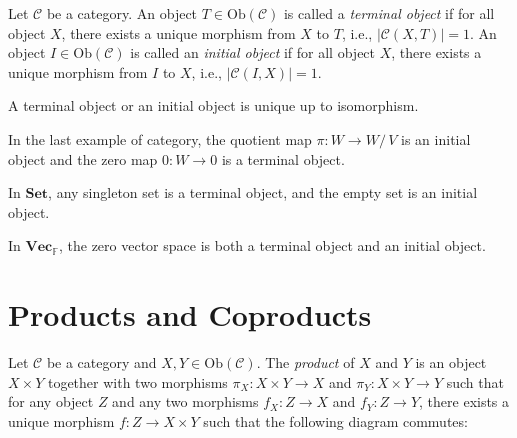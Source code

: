 \documentclass[
	11pt, %
	fleqn, %
	a4paper, %
]{LegrandOrangeBook}
\newcommand{\quotient}[2]{#1 /\, #2} %
\newcommand{\F}{\mathbb{F}} %
\newcommand{\C}{\mathcal{C}} %
\newcommand{\Set}{\textbf{Set}} %
\newcommand{\Vect}{\textbf{Vec}} %
\newcommand{\Ob}[1]{\text{Ob}(#1)} %
\begin{document}
\begin{definition}
    Let $\C$ be a category. An object $T \in \Ob{\C}$ is called a \emph{terminal object} if for all object $X$, there exists a unique morphism from $X$ to $T$, i.e., $|\C(X, T)| = 1$. An object $I \in \Ob{\C}$ is called an \emph{initial object} if for all object $X$, there exists a unique morphism from $I$ to $X$, i.e., $|\C(I, X)| = 1$.
\end{definition}

\begin{corollary}
    A terminal object or an initial object is unique up to isomorphism.
\end{corollary}

\begin{example}
    In the last example of category, the quotient map $\pi : W \to \quotient{W}{V}$ is an initial object and the zero map $0 : W \to 0$ is a terminal object.
\end{example}

\begin{example}
    In $\Set$, any singleton set is a terminal object, and the empty set is an initial object.
\end{example}

\begin{example}
    In $\Vect_{\F}$, the zero vector space is both a terminal object and an initial object.
\end{example}

\newpage

\section{Products and Coproducts}

\begin{definition}[Products]
    Let $\C$ be a category and $X, Y \in \Ob{\C}$. The \emph{product} of $X$ and $Y$ is an object $X \times Y$ together with two morphisms $\pi_X : X \times Y \to X$ and $\pi_Y : X \times Y \to Y$ such that for any object $Z$ and any two morphisms $f_X : Z \to X$ and $f_Y : Z \to Y$, there exists a unique morphism $f : Z \to X \times Y$ such that the following diagram commutes:
    \begin{center}
    \end{center}
\end{definition}
\end{document}
